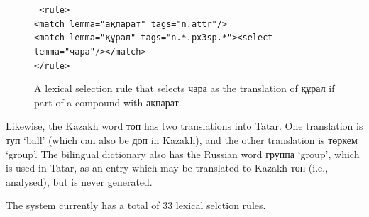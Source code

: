 \documentclass[11pt]{article}
\newcommand{\eng}[1]{`#1'}
\begin{document}
\begin{figure}[htbp]
\hspace{3cm}\parbox[t]{0.7\textwidth}{{\tt
  <rule> \\
    <match lemma="ақпарат" tags="n.attr"/> \\
    <match lemma="құрал" tags="n.*.px3sp.*"><select lemma="чара"/></match> \\
  </rule>
}}%
\caption{A lexical selection rule that selects чара as the translation of құрал if part of a compound with ақпарат.}
\label{fig:lrx}
\end{figure}

Likewise, the Kazakh word топ has two translations into Tatar.  One translation is туп \eng{ball} (which can also 
be доп in Kazakh), and the other translation is төркем \eng{group}.  The bilingual dictionary also has 
the Russian word группа \eng{group}, which is used in Tatar, as an entry which may be translated 
to Kazakh топ (i.e., analysed), but is never generated.

The system currently has a total of 33 lexical selction rules.

\end{document}
